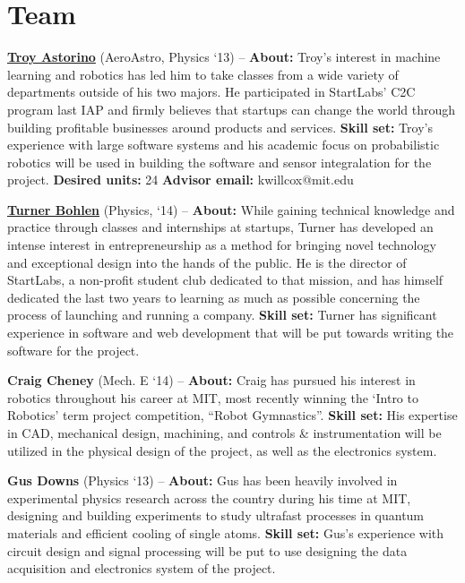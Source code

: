 \documentclass[8pt]{article}
\begin{document}
\section*{Team}
\textbf{\href{http://www.troyastorino.com}{Troy Astorino}} (AeroAstro, Physics
`13) -- \textbf{About:} Troy's interest in machine learning and robotics has led
him to take classes from a wide variety of departments outside of his two
majors. He participated in StartLabs' C2C program last IAP and firmly believes
that startups can change the world through building profitable businesses around
products and services. \textbf{Skill set:} Troy's experience with large software
systems and his academic focus on probabilistic robotics will be used in
building the software and sensor integralation for the project. \textbf{Desired units:} 24 \textbf{Advisor email:} kwillcox@mit.edu

\vspace{.2cm}

\noindent \textbf{\href{http://www.turnerbohlen.com}{Turner Bohlen}} (Physics, `14) -- \textbf{About:} While gaining technical knowledge and practice through classes and internships at startups, Turner has developed an intense interest in entrepreneurship as a method for bringing novel technology and exceptional design into the hands of the public. He is the director of StartLabs, a non-profit student club dedicated to that mission, and has himself dedicated the last two years to learning as much as possible concerning the process of launching and running a company. \textbf{Skill set:} Turner has significant experience in software and web development that will be put towards writing the software for the project.

\vspace{.2cm}

\noindent \textbf{Craig Cheney} (Mech. E `14) -- \textbf{About:} Craig has pursued his interest in robotics throughout his career at MIT, most recently winning the `Intro to Robotics' term project competition, ``Robot Gymnastics''. \textbf{Skill set:} His expertise in CAD, mechanical design, machining, and controls \& instrumentation will be utilized in the physical design of the project, as well as the electronics system.

\vspace{.2cm}

\noindent \textbf{Gus Downs} (Physics `13) -- \textbf{About:} Gus has been heavily involved in experimental physics research across the country during his time at MIT, designing and building experiments to study ultrafast processes in quantum materials and efficient cooling of single atoms. \textbf{Skill set:} Gus's experience with circuit design and signal processing will be put to use designing the data acquisition and electronics system of the project.
\end{document}
